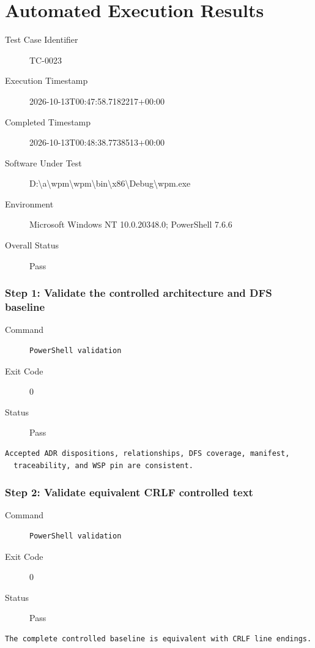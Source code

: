 \section*{Automated Execution Results}
\begin{description}
\item[Test Case Identifier] TC-0023
\item[Execution Timestamp] 2026-10-13T00:47:58.7182217+00:00
\item[Completed Timestamp] 2026-10-13T00:48:38.7738513+00:00
\item[Software Under Test] D:\textbackslash{}a\textbackslash{}wpm\textbackslash{}wpm\textbackslash{}bin\textbackslash{}x86\textbackslash{}Debug\textbackslash{}wpm.exe
\item[Environment] Microsoft Windows NT 10.0.20348.0; PowerShell 7.6.6
\item[Overall Status] Pass
\end{description}
\subsubsection*{Step 1: Validate the controlled architecture and DFS baseline}
\begin{description}
\item[Command] \mbox{}
\begin{verbatim}
PowerShell validation
\end{verbatim}
\item[Exit Code] 0
\item[Status] Pass
\end{description}
\begin{verbatim}
Accepted ADR dispositions, relationships, DFS coverage, manifest,
  traceability, and WSP pin are consistent.
\end{verbatim}
\subsubsection*{Step 2: Validate equivalent CRLF controlled text}
\begin{description}
\item[Command] \mbox{}
\begin{verbatim}
PowerShell validation
\end{verbatim}
\item[Exit Code] 0
\item[Status] Pass
\end{description}
\begin{verbatim}
The complete controlled baseline is equivalent with CRLF line endings.
\end{verbatim}

